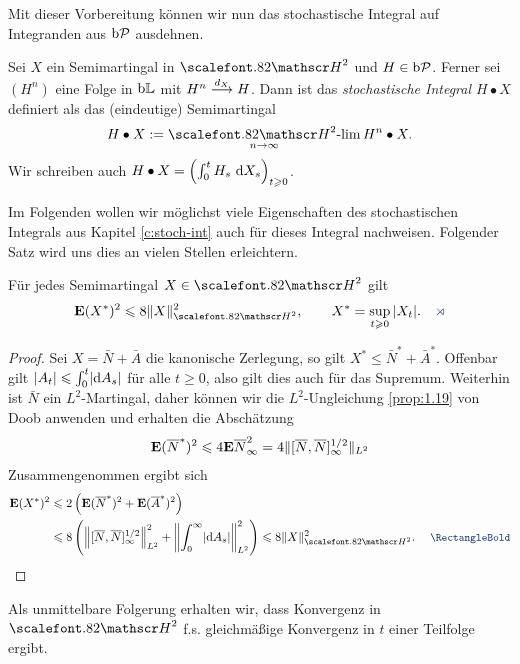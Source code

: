 Mit dieser Vorbereitung können wir nun das stochastische Integral auf
Integranden aus $\mathrm{b}\mathcal{P}$ ausdehnen.

\begin{definition}
\label{defn:4.3}
Sei $X$ ein Semimartingal in $\cH^2$ und $H\in\mathrm{b}\mathcal{P}$. Ferner sei $(H^n)$ eine
Folge in $\mathrm{b}\mathbb{L}$ mit $H^n \overset{d_{X}}{\longrightarrow} H$. Dann ist das \emph{stochastische Integral $H
\bullet X$} definiert als das (eindeutige) Semimartingal
\begin{align*}
H\bullet X \defl \Hlim\limits_{n\to \infty} H^n\bullet X.
\end{align*}
Wir schreiben auch $H\bullet X = \Bigl(\int_0^t H_s\, \,\mathrm{d} X_s \Bigr)_{t \geqslant 0}
$.\fish
\end{definition}

Im Folgenden wollen wir möglichst viele Eigenschaften des
stochastischen Integrals aus Kapitel \ref{c:stoch-int} auch für dieses Integral
nachweisen. Folgender Satz wird uns dies an vielen Stellen erleichtern.

\begin{theorem}
\label{prop:4.5}
Für jedes Semimartingal $X\in\cH^2$ gilt
\begin{align*}
\E (X^*)^2 \le 8 \|X\|^2_{\cH^2},\qquad X^* = \sup_{t\ge 0} |X_t|.\fish 
\end{align*}
\end{theorem}
\begin{proof}
Sei $X = \bar{N}+\bar{A}$ die kanonische Zerlegung, so gilt $X^* \le \bar{N}^*
+ \bar{A}^*$. Offenbar gilt $\lvert A_t\rvert\leqslant \int_0^t \lvert\mathrm{d} A_s\rvert$ für alle $t\ge
0$, also gilt dies auch für das Supremum. Weiterhin ist $\bar{N}$ ein
$L^2$-Martingal, daher können wir die $L^2$-Ungleichung \ref{prop:1.19} von Doob
anwenden und erhalten die Abschätzung
\begin{align*}
\mathbf{E} (\overline{N}^*)^2 \leqslant 4 \mathbf{E} \overline{N}_\infty^2 =
4\lVert[\overline{N},\overline{N}]_\infty^{1/2}\rVert_{L^2}
\end{align*}
Zusammengenommen ergibt sich
\begin{align*}
\E (X^*)^2 &\le 2 \left(\E (\bar{N}^*)^2 + \E (\bar{A}^*)^2\right)\\
&\le 8 \left( \norm*{[\bar{N},\bar{N}]_\infty^{1/2}}_{L^2}^2 +
\norm*{\int_0^\infty \abs{\dA_s}}_{L^2}^2\right)\le 8\norm{X}_{\HH^2}^2.\qed
\end{align*}
\end{proof}

Als unmittelbare Folgerung erhalten wir, dass Konvergenz in $\HH^2$ f.s.
gleichmäßige Konvergenz in $t$ einer Teilfolge ergibt.


